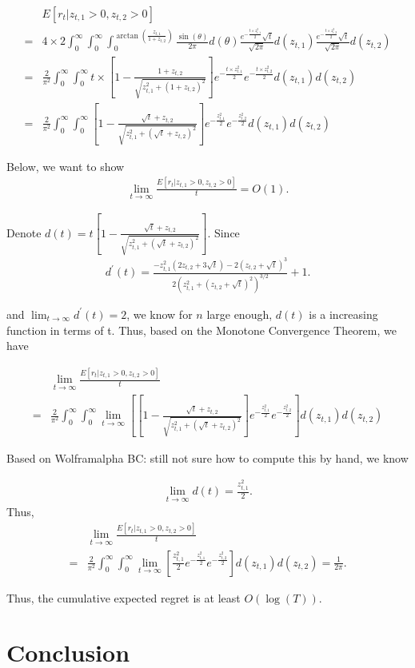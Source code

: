 \documentclass{article}
\newcommand{\bccomment}[1]{{\color{blue}BC: #1}}
\begin{document}
\begin{align}
&E[r_t| z_{t,1}>0, z_{t,2}>0] \nonumber \\
=& 4\times 2 \int_{0}^{\infty} \int_{0}^{\infty} \int_{0}^{\arctan\left(\frac{z_{t,1}}{1+z_{t,2}}\right)}\frac{\sin(\theta)}{2\pi}d(\theta)\frac{e^{-\frac{t \times z_{t,1}^2}{2}}\sqrt{t}}{\sqrt{2\pi}}d(z_{t,1})\frac{e^{-\frac{t \times z_{t,2}^2}{2}}\sqrt{t}}{\sqrt{2\pi}}d(z_{t,2}) \nonumber \\
=& \frac{2}{\pi^2}\int_{0}^{\infty} \int_{0}^{\infty}t\times \left[1-\frac{1+z_{t,2}}{\sqrt{z_{t,1}^2+(1+z_{t,2})^2}}\right]e^{-\frac{t \times z_{t,1}^2}{2}}e^{-\frac{t \times z_{t,2}^2}{2}}d(z_{t,1})d(z_{t,2}) \nonumber \\
=& \frac{2}{\pi^2}\int_{0}^{\infty} \int_{0}^{\infty} \left[1-\frac{\sqrt{t}+z_{t,2}}{\sqrt{z_{t,1}^2+(\sqrt{t}+z_{t,2})^2}}\right]e^{-\frac{z_{t,1}^2}{2}}e^{-\frac{z_{t,2}^2}{2}}d(z_{t,1})d(z_{t,2}) \nonumber 
\end{align}

Below, we want to show 
\begin{align}
\lim_{t\rightarrow\infty}\frac{E[r_t| z_{t,1}>0, z_{t,2}>0]}{t} = O(1). \nonumber
\end{align}

Denote $d(t)=t\left[1-\frac{\sqrt{t}+z_{t,2}}{\sqrt{z_{t,1}^2+(\sqrt{t}+z_{t,2})^2}}\right]$.
Since
\begin{align}
d^{'}(t)=\frac{-z_{t,1}^2(2z_{t,2}+3\sqrt{t})-2(z_{t,2}+\sqrt{t})^3}{2(z_{t,1}^2+(z_{t,2}+\sqrt{t})^2)^{3/2}}+1. \nonumber
\end{align}

and $\lim_{t\rightarrow \infty}d^{'}(t)=2$, we know for $n$ large enough, $d(t)$ is a increasing function in terms of t. Thus, based on the Monotone Convergence Theorem, we have

\begin{align}
&\lim_{t\rightarrow \infty}\frac{E[r_t| z_{t,1}>0, z_{t,2}>0]}{t} \nonumber \\
=& \frac{2}{\pi^2}\int_{0}^{\infty} \int_{0}^{\infty}\lim_{t\rightarrow \infty}\left[ \left[1-\frac{\sqrt{t}+z_{t,2}}{\sqrt{z_{t,1}^2+(\sqrt{t}+z_{t,2})^2}}\right]e^{-\frac{z_{t,1}^2}{2}}e^{-\frac{z_{t,2}^2}{2}}\right]d(z_{t,1})d(z_{t,2}) \nonumber  
\end{align}


Based on Wolframalpha \bccomment{still not sure how to compute this by hand}, we know

\begin{align}
\lim_{t\rightarrow \infty} d(t)=\frac{z_{t,1}^2}{2}. \nonumber
\end{align}
Thus,
\begin{align}
&\lim_{t\rightarrow \infty}\frac{E[r_t| z_{t,1}>0, z_{t,2}>0]}{t} \nonumber \\
=&\frac{2}{\pi^2}\int_{0}^{\infty} \int_{0}^{\infty}\lim_{t\rightarrow \infty}\left[ \frac{z_{t,1}^2}{2}e^{-\frac{z_{t,1}^2}{2}}e^{-\frac{z_{t,2}^2}{2}}\right]d(z_{t,1})d(z_{t,2}) = \frac{1}{2\pi}. \nonumber
\end{align}


Thus, the cumulative expected regret is at least $O(\log(T))$.


\section{Conclusion}


{}

\end{document}
